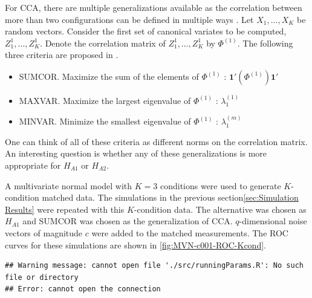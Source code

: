 \documentclass[11pt]{article} %
\begin{document}
For CCA, there are multiple generalizations available as the correlation between more than two configurations can be defined in multiple ways \cite{generalCCA}. Let $X_1,\ldots,X_K$ be random vectors. Consider the first set of canonical variates to be computed, $Z_1^{1},\ldots,Z_K^{1}$. Denote  the correlation matrix of  $Z_1^{1},\ldots,Z_K^{1}$ by $\Phi^{(1)}$.   The following three criteria  are proposed in \cite{generalCCA}.
\begin{itemize}
\item SUMCOR. Maximize the sum of the elements of $\Phi^{(1)}$ : $\mathbf{1'}(\Phi^{(1)})\mathbf{1'}$
\item MAXVAR. Maximize the largest eigenvalue of $\Phi^{(1)}$ : $\lambda^{(1)}_1$ 
\item  MINVAR. Minimize  the smallest eigenvalue of $\Phi^{(1)}$ : $\lambda^{(m)}_1$ 
\end{itemize}
One can think of all of these criteria as different norms on the correlation matrix.
An interesting question is whether any of these generalizations is more appropriate for $H_{A1}$ or $H_{A2}$.

A multivariate normal model with $K=3$ conditions were used to generate $K$-condition matched data. 
The simulations in the previous section\ref{sec:Simulation Results} were repeated with this $K$-condition data. 
The alternative was chosen as $ H_{A1}$ and SUMCOR was chosen as the generalization of CCA.
 $q$-dimensional noise vectors of magnitude $c$ were added to the matched measurements. 
 The ROC curves for these simulations are shown in \ref{fig:MVN-c001-ROC-Kcond}.


 

\begin{knitrout}
\color{fgcolor}\begin{kframe}
\begin{verbatim}
## Warning message: cannot open file './src/runningParams.R': No such file or directory
## Error: cannot open the connection
\end{verbatim}
\end{kframe}
\end{knitrout}
\end{document}
